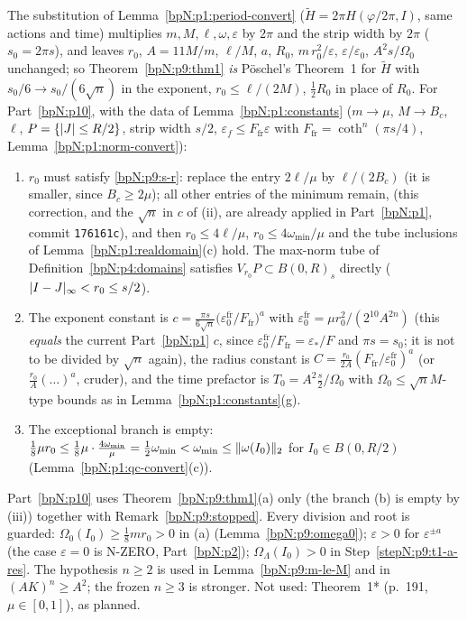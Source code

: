 \begin{remark}\label{bpN:p9:dictionary}
The substitution of Lemma~\ref{bpN:p1:period-convert} ($\tilde H=2\pi H(\varphi/2\pi,I)$, same actions and time) multiplies $m,M,\ell,\omega,\varepsilon$ by $2\pi$ and the strip width by $2\pi$ ($s_0=2\pi s$), and leaves $r_0$, $A=11M/m$, $\ell/M$, $a$, $R_0$, $m\,r_0^2/\varepsilon$, $\varepsilon/\varepsilon_0$, $A^2s/\Omega_0$ unchanged; so Theorem~\ref{bpN:p9:thm1} \emph{is} P\"oschel's Theorem~1 for $\tilde H$ with $s_0/6\to s_0/(6\sqrt n)$ in the exponent, $r_0\le\ell/(2M)$, $\frac12R_0$ in place of $R_0$. For Part~\ref{bpN:p10}, with the data of Lemma~\ref{bpN:p1:constants} ($m\to\mu$, $M\to B_c$, $\ell$, $P=\{\lvert J\rvert\le R/2\}$, strip width $s/2$, $\varepsilon_f\le F_{\mathrm{fr}}\varepsilon$ with $F_{\mathrm{fr}}=\coth^n(\pi s/4)$, Lemma~\ref{bpN:p1:norm-convert}):
\begin{enumerate}[label=(\roman*)]
\item $r_0$ must satisfy \ref{bpN:p9:s-r}: replace the entry $2\ell/\mu$ by $\ell/(2B_c)$ (it is smaller, since $B_c\ge2\mu$); all other entries of the minimum remain, (this correction, and the $\sqrt n$ in $c$ of (ii), are already applied in Part~\ref{bpN:p1}, commit \texttt{176161c}), and then $r_0\le4\ell/\mu$, $r_0\le4\omega_{\min}/\mu$ and the tube inclusions of Lemma~\ref{bpN:p1:realdomain}(c) hold. The max-norm tube of Definition~\ref{bpN:p4:domains} satisfies $V_{r_0}P\subset B(0,R)_s$ directly ($\lvert I-J\rvert_\infty<r_0\le s/2$).
\item The exponent constant is $c=\frac{\pi s}{6\sqrt n}\bigl(\varepsilon_{0}^{\mathrm{fr}}/F_{\mathrm{fr}}\bigr)^a$ with $\varepsilon_0^{\mathrm{fr}}=\mu r_0^2/(2^{10}A^{2n})$ (this \emph{equals} the current Part~\ref{bpN:p1} $c$, since $\varepsilon_0^{\mathrm{fr}}/F_{\mathrm{fr}}=\varepsilon_*/F$ and $\pi s=s_0$; it is not to be divided by $\sqrt n$ again), the radius constant is $C=\frac{r_0}{2A}(F_{\mathrm{fr}}/\varepsilon_0^{\mathrm{fr}})^a$ (or $\frac{r_0}A(\dots)^a$, cruder), and the time prefactor is $T_0=A^2\frac s2/\Omega_0$ with $\Omega_0\le\sqrt nM$-type bounds as in Lemma~\ref{bpN:p1:constants}(g).
\item The exceptional branch is empty: $\frac18\mu r_0\le\frac18\mu\cdot\frac{4\omega_{\min}}\mu=\frac12\omega_{\min}<\omega_{\min}\le\lVert \omega(I_0)\rVert_2$ for $I_0\in B(0,R/2)$ (Lemma~\ref{bpN:p1:qc-convert}(c)).
\end{enumerate}
\end{remark}

\begin{remark}\label{bpN:p9:consumers}
Part~\ref{bpN:p10} uses Theorem~\ref{bpN:p9:thm1}(a) only (the branch (b) is empty by (iii)) together with Remark~\ref{bpN:p9:stopped}. Every division and root is guarded: $\Omega_0(I_0)\ge\frac18mr_0>0$ in (a) (Lemma~\ref{bpN:p9:omega0}); $\varepsilon>0$ for $\varepsilon^{\pm a}$ (the case $\varepsilon=0$ is N-ZERO, Part~\ref{bpN:p2}); $\Omega_\Lambda(I_0)>0$ in Step~\ref{stepN:p9:t1-a-res}. The hypothesis $n\ge2$ is used in Lemma~\ref{bpN:p9:m-le-M} and in $(AK)^n\ge A^2$; the frozen $n\ge3$ is stronger. Not used: Theorem~1* (p.~191, $\mu\in[0,1]$), as planned.
\end{remark}
\endgroup
